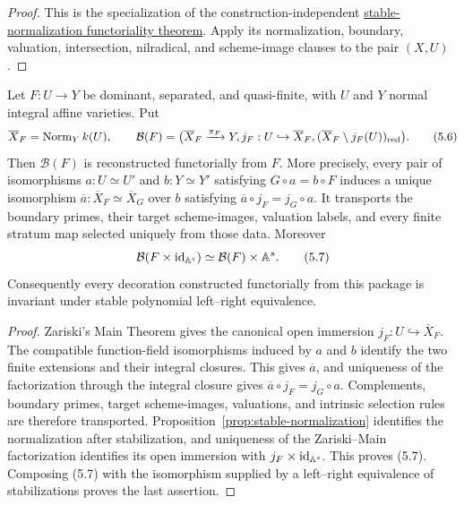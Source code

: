 \begin{proof}
This is the specialization of the construction-independent
\href{../../verified/STABLE_NORMALIZATION_FUNCTORIALITY.md}
{stable-normalization functoriality theorem}.  Apply its normalization,
boundary, valuation, intersection, nilradical, and scheme-image clauses to
the pair $(X,U)$.
\end{proof}

\begin{proposition}
\label{prop:map-intrinsic-normalization}
Let $F:U\to Y$ be dominant, separated, and quasi-finite, with $U$ and $Y$
normal integral affine varieties.  Put
\[
 \overline X_F=\operatorname{Norm}_Y k(U),\qquad
 \mathcal B(F)=
 \bigl(\overline X_F\xrightarrow{\pi_F}Y,
       j_F:U\hookrightarrow\overline X_F,
       (\overline X_F\setminus j_F(U))_{\rm red}\bigr). \tag{5.6}
\]
Then $\mathcal B(F)$ is reconstructed functorially from $F$.  More precisely,
every pair of isomorphisms $a:U\simeq U'$ and $b:Y\simeq Y'$ satisfying
$G\circ a=b\circ F$ induces a unique isomorphism
$\overline a:\overline X_F\simeq\overline X_G$ over $b$ satisfying
$\overline a\circ j_F=j_G\circ a$.  It transports the boundary primes,
their target scheme-images, valuation labels, and every finite stratum map
selected uniquely from those data.  Moreover
\[
 \mathcal B(F\times\mathrm{id}_{\mathbb A^s})
 \simeq \mathcal B(F)\times\mathbb A^s.                       \tag{5.7}
\]
Consequently every decoration constructed functorially from this package is
invariant under stable polynomial left--right equivalence.
\end{proposition}

\begin{proof}
Zariski's Main Theorem gives the canonical open immersion
$j_F:U\hookrightarrow\overline X_F$.  The compatible function-field
isomorphisms induced by $a$ and $b$ identify the two finite extensions and
their integral closures.  This gives $\overline a$, and uniqueness of the
factorization through the integral closure gives
$\overline a\circ j_F=j_G\circ a$.  Complements, boundary primes, target
scheme-images, valuations, and intrinsic selection rules are therefore
transported.  Proposition~\ref{prop:stable-normalization} identifies the
normalization after stabilization, and uniqueness of the Zariski--Main
factorization identifies its open immersion with
$j_F\times\mathrm{id}_{\mathbb A^s}$.  This proves (5.7).  Composing (5.7) with the
isomorphism supplied by a left--right equivalence of stabilizations proves
the last assertion.
\end{proof}

